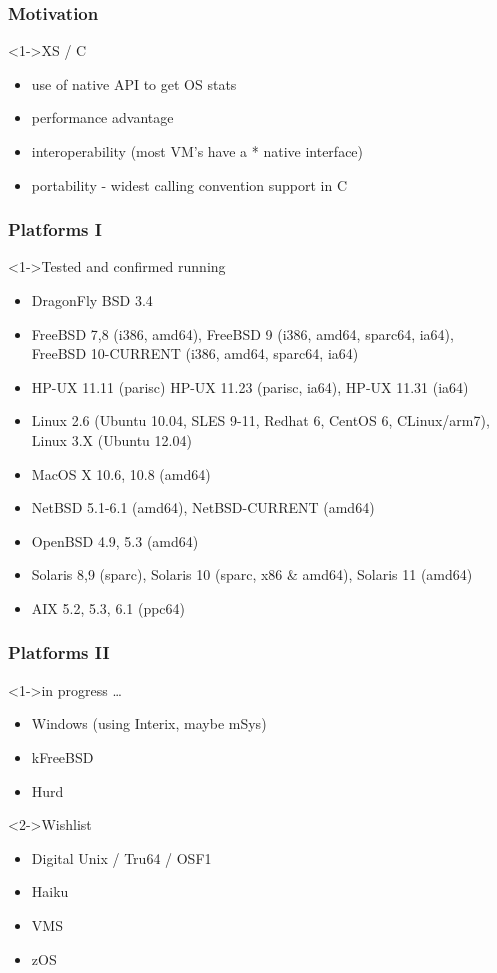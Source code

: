 \documentclass[ngerman,xcolor={table,dvipsnames},smaller,compress,hyperref={bookmarks,colorlinks}]{beamer}
\begin{document}
\begin{frame}[fragile]
\frametitle{Motivation}

\begin{block}<1->{XS / C}
\begin{itemize}
\item use of native API to get OS stats
\item performance advantage
\item interoperability (most VM's have a * native interface)
\item portability - widest calling convention support in C
\end{itemize}
\end{block}

\end{frame}

\begin{frame}[fragile]
\frametitle{Platforms I}
\begin{block}<1->{Tested and confirmed running}
\begin{itemize}
\item DragonFly BSD 3.4
\item FreeBSD 7,8 (i386, amd64), FreeBSD 9 (i386, amd64, sparc64, ia64), FreeBSD 10-CURRENT (i386, amd64, sparc64, ia64)
\item HP-UX 11.11 (parisc) HP-UX 11.23 (parisc, ia64), HP-UX 11.31 (ia64)
\item Linux 2.6 (Ubuntu 10.04, SLES 9-11, Redhat 6, CentOS 6, \textmu{}CLinux/arm7), Linux 3.X (Ubuntu 12.04)
\item MacOS X 10.6, 10.8 (amd64)
\item NetBSD 5.1-6.1 (amd64), NetBSD-CURRENT (amd64)
\item OpenBSD 4.9, 5.3 (amd64)
\item Solaris 8,9 (sparc), Solaris 10 (sparc, x86 \& amd64), Solaris 11 (amd64)
\item AIX 5.2, 5.3, 6.1 (ppc64)
\end{itemize}
\end{block}
\end{frame}

\begin{frame}[fragile]
\frametitle{Platforms II}
\begin{block}<1->{in progress \ldots}
\begin{itemize}
\item Windows (using Interix, maybe mSys)
\item kFreeBSD
\item Hurd
\end{itemize}
\end{block}

\begin{block}<2->{Wishlist}
\begin{itemize}
\item Digital Unix / Tru64 / OSF1
\item Haiku
\item VMS
\item zOS
\end{itemize}
\end{block}
\end{frame}
\end{document}
